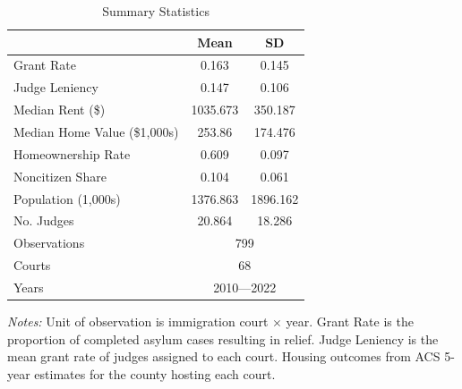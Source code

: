 \begin{table}[htbp]
\centering
\caption{Summary Statistics}\label{tab:summary}
\begin{tabular}{lcc}
\hline\hline
& Mean & SD \\
\hline
Grant Rate & 0.163 & 0.145 \\
Judge Leniency & 0.147 & 0.106 \\
Median Rent (\$) & 1035.673 & 350.187 \\
Median Home Value (\$1,000s) & 253.86 & 174.476 \\
Homeownership Rate & 0.609 & 0.097 \\
Noncitizen Share & 0.104 & 0.061 \\
Population (1,000s) & 1376.863 & 1896.162 \\
No. Judges & 20.864 & 18.286 \\
\hline
Observations & \multicolumn{2}{c}{799} \\
Courts & \multicolumn{2}{c}{68} \\
Years & \multicolumn{2}{c}{2010---2022} \\
\hline\hline
\end{tabular}
\begin{tablenotes}\small
\item \textit{Notes:} Unit of observation is immigration court $\times$ year. Grant Rate is the proportion of completed asylum cases resulting in relief. Judge Leniency is the mean grant rate of judges assigned to each court. Housing outcomes from ACS 5-year estimates for the county hosting each court.
\end{tablenotes}
\end{table}
